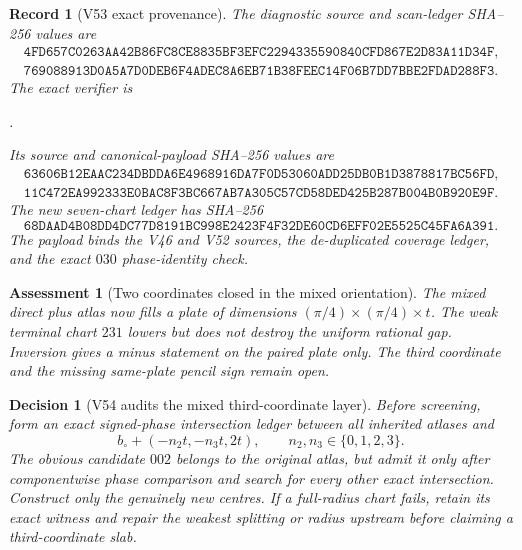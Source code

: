 \documentclass[11pt,oneside]{article}
\newtheorem{assessment}[theorem]{Assessment}
\newtheorem{record}[theorem]{Record}
\newtheorem{decision}[theorem]{Decision}
\theoremstyle{definition}
\theoremstyle{remark}
\begin{document}
\begin{record}[V53 exact provenance]
\label{rec:newv53-provenance}
The diagnostic source and scan-ledger SHA--256 values are
\[
\begin{gathered}
\texttt{4FD657C0263AA42B86FC8CE8835BF3EFC2294335590840CFD867E2D83A11D34F},\\
\texttt{769088913D0A5A7D0DEB6F4ADEC8A6EB71B38FEEC14F06B7DD7BBE2FDAD288F3}.
\end{gathered}                                         \tag{53.11}
\]
The exact verifier is
\begin{center}
\footnotesize
{}.
\end{center}
Its source and canonical-payload SHA--256 values are
\[
\begin{gathered}
\texttt{63606B12EAAC234DBDDA6E4968916DA7F0D53060ADD25DB0B1D3878817BC56FD},\\
\texttt{11C472EA992333E0BAC8F3BC667AB7A305C57CD58DED425B287B004B0B920E9F}.
\end{gathered}                                         \tag{53.12}
\]
The new seven-chart ledger has SHA--256
\[
\texttt{68DAAD4B08DD4DC77D8191BC998E2423F4F32DE60CD6EFF02E5525C45FA6A391}.
                                                               \tag{53.13}
\]
The payload binds the V46 and V52 sources, the de-duplicated
coverage ledger, and the exact \(030\) phase-identity check.
\end{record}

\begin{assessment}[Two coordinates closed in the mixed orientation]
\label{ass:newv53}
The mixed direct plus atlas now fills a plate of dimensions
\((\pi/4)\times(\pi/4)\times t\).  The weak terminal chart \(231\)
lowers but does not destroy the uniform rational gap.  Inversion
gives a minus statement on the paired plate only.  The third
coordinate and the missing same-plate pencil sign remain open.
\end{assessment}

\begin{decision}[V54 audits the mixed third-coordinate layer]
\label{dec:newv53-next}
Before screening, form an exact signed-phase intersection ledger
between all inherited atlases and
\[
 b_\circ+(-n_2t,-n_3t,2t),
 \qquad n_2,n_3\in\{0,1,2,3\}.                        \tag{53.14}
\]
The obvious candidate \(002\) belongs to the original atlas, but
admit it only after componentwise phase comparison and search for
every other exact intersection.  Construct only the genuinely new
centres.  If a full-radius chart fails, retain its exact witness
and repair the weakest splitting or radius upstream before
claiming a third-coordinate slab.
\end{decision}
\end{document}
